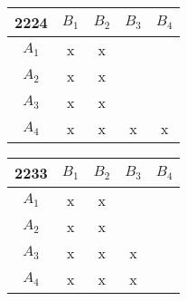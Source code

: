 \begin{tabular}{c||c|c|c|c}
2224 & $B_1$ & $B_2$ & $B_3$ & $B_4$ \\\hline\hline
 $A_1$ & x & x & ~ & ~ \\
 $A_2$ & x & x & ~ & ~ \\
 $A_3$ & x & x & ~ & ~ \\
 $A_4$ & x & x & x & x \\
\end{tabular}
\hfill
\begin{tabular}{c||c|c|c|c}
2233 & $B_1$ & $B_2$ & $B_3$ & $B_4$ \\\hline\hline
 $A_1$ & x & x & ~ & ~ \\
 $A_2$ & x & x & ~ & ~ \\
 $A_3$ & x & x & x & ~ \\
 $A_4$ & x & x & x & ~ \\
\end{tabular}


~


